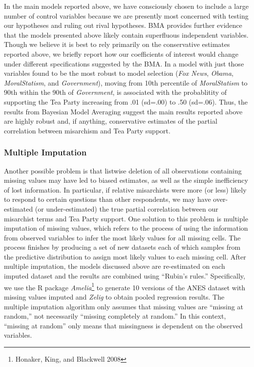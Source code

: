 \documentclass[12pt,]{article}
\begin{document}
In the main models reported above, we have consciously chosen to include
a large number of control variables because we are presently most
concerned with testing our hypotheses and ruling out rival hypotheses.
BMA provides further evidence that the models presented above likely
contain superfluous independent variables. Though we believe it is best
to rely primarily on the conservative estimates reported above, we
briefly report how our coefficients of interest would change under
different specifications suggested by the BMA. In a model with just
those variables found to be the most robust to model selection
(\emph{Fox News}, \emph{Obama}, \emph{MoralStatism}, and
\emph{Government}), moving from 10th percentile of \emph{MoralStatism}
to 90th within the 90th of \emph{Government}, is associated with the
probablitity of supporting the Tea Party increasing from .01 (sd=.00) to
.50 (sd=.06). Thus, the results from Bayesian Model Averaging suggest
the main results reported above are highly robust and, if anything,
conservative estimates of the partial correlation between misarchism and
Tea Party support.

\subsubsection{Multiple Imputation}\label{multiple-imputation}

Another possible problem is that listwise deletion of all observations
containing missing values may have led to biased estimates, as well as
the simple inefficiency of lost information. In particular, if relative
misarchists were more (or less) likely to respond to certain questions
than other respondents, we may have over-estimated (or under-estimated)
the true partial correlation between our misarchist terms and Tea Party
support. One solution to this problem is multiple imputation of missing
values, which refers to the process of using the information from
observed variables to infer the most likely values for all missing
cells. The process finishes by producing a set of new datasets each of
which samples from the predictive distribution to assign most likely
values to each missing cell. After multiple imputation, the models
discussed above are re-estimated on each imputed dataset and the results
are combined using ``Rubin's rules.'' Specifically, we use the R package
\emph{Amelia}\footnote{Honaker, King, and Blackwell 2008} to generate 10
versions of the ANES dataset with missing values imputed and
\emph{Zelig} to obtain pooled regression results. The multiple
imputation algorithm only assumes that missing values are ``missing at
random,'' not necessarily ``missing completely at random.'' In this
context, ``missing at random'' only means that missingness is dependent
on the observed variables.
\end{document}

